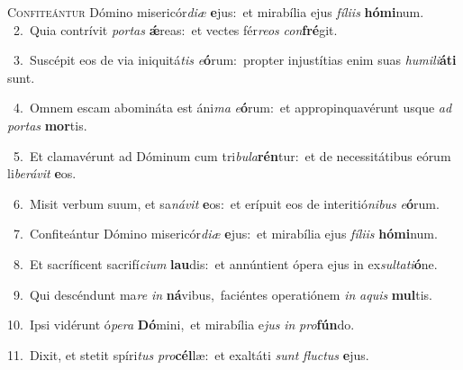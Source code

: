 \lettrine{\initial\textcolor{\initialcolor}{C}}{onfiteántur} Dómino misericór\-\textit{di}\-\textit{æ} \textbf{e}\-jus:~\star et mirabília ejus \textit{fí}\-\textit{li}\textit{is} \textbf{hó}\-\textbf{mi}num.\\
{\numbfont\textcolor{\numbcolor}{~2.}}~Quia contrívit \textit{por}\-\textit{tas} \textbf{ǽ}\-reas:~\star et vectes fér\-\textit{re}\-\textit{os} \textit{con}\-\textbf{fré}git.\par
{\numbfont\textcolor{\numbcolor}{~3.}}~Suscépit eos de via iniquitá\textit{tis} \textit{e}\-\textbf{ó}rum:~\star propter injustítias enim suas \textit{hu}\-\textit{mi}\textit{li}\textbf{á}\textbf{ti} sunt.\par
{\numbfont\textcolor{\numbcolor}{~4.}}~Omnem escam abomináta est áni\textit{ma} \textit{e}\-\textbf{ó}rum:~\star et appropinquavérunt usque \textit{ad} \textit{por}\-\textit{tas} \textbf{mor}\-tis.\par
{\numbfont\textcolor{\numbcolor}{~5.}}~Et clamavérunt ad Dóminum cum tri\-\textit{bu}\-\textit{la}\textbf{rén}tur:~\star et de necessitátibus eórum li\-\textit{be}\-\textit{rá}\textit{vit} \textbf{e}\-os.\par
{\numbfont\textcolor{\numbcolor}{~6.}}~Misit verbum suum, et sa\-\textit{ná}\-\textit{vit} \textbf{e}\-os:~\star et erípuit eos de interitió\-\textit{ni}\-\textit{bus} \textit{e}\-\textbf{ó}rum.\par
{\numbfont\textcolor{\numbcolor}{~7.}}~Confiteántur Dómino misericór\-\textit{di}\-\textit{æ} \textbf{e}\-jus:~\star et mirabília ejus \textit{fí}\-\textit{li}\textit{is} \textbf{hó}\-\textbf{mi}num.\par
{\numbfont\textcolor{\numbcolor}{~8.}}~Et sacríficent sacrifí\-\textit{ci}\-\textit{um} \textbf{lau}\-dis:~\star et annúntient ópera ejus in ex\-\textit{sul}\-\textit{ta}\textit{ti}\textbf{ó}ne.\par
{\numbfont\textcolor{\numbcolor}{~9.}}~Qui descéndunt ma\textit{re} \textit{in} \textbf{ná}\-vibus,~\star faciéntes operatiónem \textit{in} \textit{a}\-\textit{quis} \textbf{mul}\-tis.\par
{\numbfont\textcolor{\numbcolor}{10.}}~Ipsi vidérunt ó\-\textit{pe}\-\textit{ra} \textbf{Dó}\-mini,~\star et mirabília e\textit{jus} \textit{in} \textit{pro}\-\textbf{fún}do.\par
{\numbfont\textcolor{\numbcolor}{11.}}~Dixit, et stetit spíri\textit{tus} \textit{pro}\-\textbf{cél}læ:~\star et exaltáti \textit{sunt} \textit{fluc}\-\textit{tus} \textbf{e}\-jus.\par
